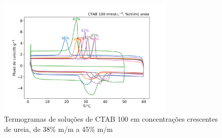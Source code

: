 		\begin{figure}[H]
			\centering
			\includegraphics[width=0.75\textwidth]{./imagens/dsc/CTAB_porc_ur}
			\caption{Termogramas de soluções de CTAB 100 \mM{} em concentrações crescentes de ureia, de 38\% m/m a 45\% m/m}
			\label{fig:DSC_CTAB_UR38-45}
		\end{figure}
		
